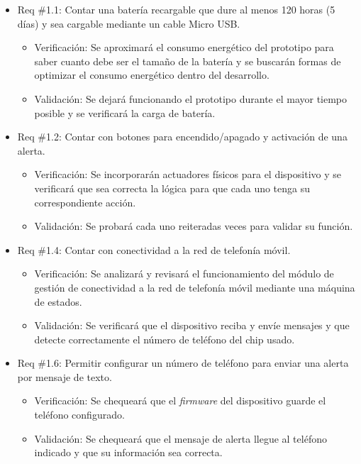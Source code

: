 \documentclass[
11pt, %
]{charter}
\begin{document}
\begin{itemize} 
\item Req \#1.1: Contar una batería recargable que dure al menos 120 horas (5 días) y sea cargable mediante un cable Micro USB.

\begin{itemize}
	\item Verificación: Se aproximará el consumo energético del prototipo para saber cuanto debe ser el tamaño de la batería y se buscarán formas de optimizar el consumo energético dentro del desarrollo.
	\item Validación: Se dejará funcionando el prototipo durante el mayor tiempo posible y se verificará la carga de batería.
\end{itemize}

\item Req \#1.2: Contar con botones para encendido/apagado y activación de una alerta.

\begin{itemize}
	\item Verificación: Se incorporarán actuadores físicos para el dispositivo y se verificará que sea correcta la lógica para que cada uno tenga su correspondiente acción.
	\item Validación: Se probará cada uno reiteradas veces para validar su función.
\end{itemize}

\item Req \#1.4: Contar con conectividad a la red de telefonía móvil.

\begin{itemize}
	\item Verificación: Se analizará y revisará el funcionamiento del módulo de gestión de conectividad a la red de telefonía móvil mediante una máquina de estados.
	\item Validación: Se verificará que el dispositivo reciba y envíe mensajes y que detecte correctamente el número de teléfono del chip usado.
\end{itemize}

\item Req \#1.6: Permitir configurar un número de teléfono para enviar una alerta por mensaje de texto.

\begin{itemize}
	\item Verificación: Se chequeará que el \textit{firmware} del dispositivo guarde el teléfono configurado.
	\item Validación: Se chequeará que el mensaje de alerta llegue al teléfono indicado y que su información sea correcta.
\end{itemize}


\end{itemize}
\end{document}
